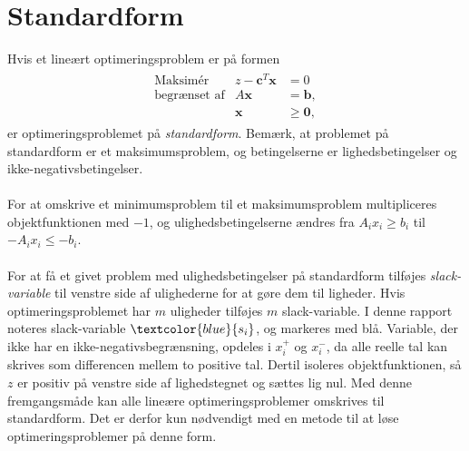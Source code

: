 \section{Standardform}
\label{sec:standard}
% 
Hvis et lineært optimeringsproblem er på formen
%
\begin{align*}
\begin{array}{lrl}
\text{Maksimér}		&z - \textbf{c}^T\textbf{x}	&	=0		\\
\text{begrænset af}	&A\textbf{x}	&=\mathbf{b},	\\
					&\mathbf{x}				&\geq \mathbf{0},
\end{array}
\end{align*}
%
er optimeringsproblemet på \textit{standardform}.
Bemærk, at problemet på standardform er et maksimumsproblem, og betingelserne er lighedsbetingelser og ikke-negativsbetingelser.
\\\\
%
For at omskrive et minimumsproblem til et maksimumsproblem multipliceres objektfunktionen med $-1$, og ulighedsbetingelserne ændres fra $A_ix_i \geq b_i$ til $-A_ix_i \leq -b_i$.
\\\\
%
For at få et givet problem med ulighedsbetingelser på standardform tilføjes \textit{slack-variable} til venstre side af ulighederne for at gøre dem til ligheder. 
Hvis optimeringsproblemet har $m$ uligheder tilføjes $m$ slack-variable.
I denne rapport noteres slack-variable $\textcolor{blue}{s_i}$, og markeres med blå.
Variable, der ikke har en ikke-negativsbegrænsning, opdeles i $x_i^+$ og $x_i^-$, da alle reelle tal kan skrives som differencen mellem to positive tal.
Dertil isoleres objektfunktionen, så $z$ er positiv på venstre side af lighedstegnet og sættes lig nul.
Med denne fremgangsmåde kan alle lineære optimeringsproblemer omskrives til standardform.
Det er derfor kun nødvendigt med en metode til at løse optimeringsproblemer på denne form.
%

